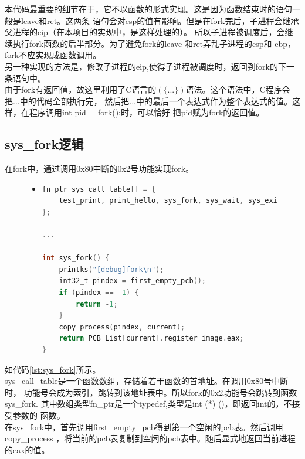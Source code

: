 \documentclass[a4paper]{article}
\begin{document}
    本代码最重要的细节在于，它不以函数的形式实现。这是因为函数结束时的语句一般是leave和ret。这两条
    语句会对esp的值有影响。但是在fork完后，子进程会继承父进程的eip（在本项目的实现中，是这样处理的）。
    所以子进程被调度后，会继续执行fork函数的后半部分。为了避免fork的leave 和ret弄乱子进程的esp和
    ebp，fork不应实现成函数调用。\\ 

    另一种实现的方法是，修改子进程的eip,使得子进程被调度时，返回到fork的下一条语句中。 \\ 

    由于fork有返回值，故这里利用了C语言的$(\{...\})$语法。这个语法中，C程序会把...中的代码全部执行完，
    然后把...中的最后一个表达式作为整个表达式的值。这样，在程序调用int pid = fork();时，可以恰好
    把pid赋为fork的返回值。
    \subsection{sys\_fork逻辑}
    在fork中，通过调用0x80中断的0x2号功能实现fork。
    \begin{figure}[!hbt]
    \begin{itemize}
    \item[] \begin{lstlisting}[language=C, label=lst:sys_fork, caption=sys\_fork逻辑]
fn_ptr sys_call_table[] = {
    test_print, print_hello, sys_fork, sys_wait, sys_exit
};

...

int sys_fork() {
    printks("[debug]fork\n");
    int32_t pindex = first_empty_pcb();
    if (pindex == -1) {
        return -1;
    }
    copy_process(pindex, current);
    return PCB_List[current].register_image.eax;
}

    \end{lstlisting}
    \end{itemize}
    \end{figure}
    如代码\ref{lst:sys_fork}所示。\\ 

    sys\_call\_table是一个函数数组，存储着若干函数的首地址。在调用0x80号中断时，
    功能号会成为索引，跳转到该地址表中。所以fork的0x2功能号会跳转到函数sys\_fork.
    其中数组类型fn\_ptr是一个typedef,类型是int (*) ()，即返回int的，不接受参数的
    函数。\\ 

    在sys\_fork中，首先调用first\_empty\_pcb得到第一个空闲的pcb表。然后调用copy\_process
    ，将当前的pcb表复制到空闲的pcb表中。随后显式地返回当前进程的eax的值。
\end{document}
